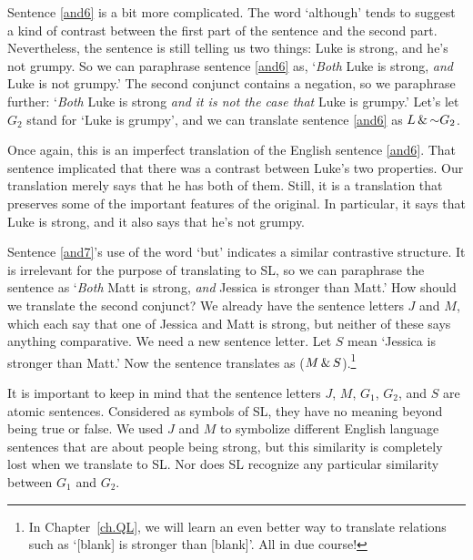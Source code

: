 Sentence \ref{and6} is a bit more complicated. The word `although' tends to suggest a kind of contrast between the first part of the sentence and the second part. Nevertheless, the sentence is still telling us two things: Luke is strong, and he's not grumpy. So we can paraphrase sentence \ref{and6} as, `\emph{Both} Luke is strong, \emph{and} Luke is not grumpy.' The second conjunct contains a negation, so we paraphrase further: `\emph{Both} Luke is strong \emph{and} \emph{it is not the case that} Luke is grumpy.' Let's let $G_{2}$ stand for `Luke is grumpy', and we can translate sentence \ref{and6} as $L\eand\enot G_{2}$.

Once again, this is an imperfect translation of the English sentence \ref{and6}. That sentence implicated that there was a contrast between Luke's two properties. Our translation merely says that he has both of them. Still, it is a translation that preserves some of the important features of the original. In particular, it says that Luke is strong, and it also says that he's not grumpy.

Sentence \ref{and7}'s use of the word `but' indicates a similar contrastive structure. It is irrelevant for the purpose of translating to SL, so we can paraphrase the sentence as `\emph{Both} Matt is strong, \emph{and} Jessica is stronger than Matt.' How should we translate the second conjunct? We already have the sentence letters $J$ and $M$, which each say that one of Jessica and Matt is strong, but neither of these says anything comparative. We need a new sentence letter. Let $S$ mean `Jessica is stronger than Matt.' Now the sentence translates as ($M \,\&\, S$).\footnote{{\color{black} In Chapter~\ref{ch.QL}, we will learn an even better way to translate relations such as `[blank] is stronger than [blank]'. All in due course!}}


It is important to keep in mind that the sentence letters $J$, $M$, $G_{1}$, $G_{2}$, and $S$ are atomic sentences. Considered as symbols of SL, they have no meaning beyond being true or false. We used $J$ and $M$ to symbolize different English language sentences that are about people being strong, but this similarity is completely lost when we translate to SL. Nor does SL recognize any particular similarity between $G_{1}$ and $G_{2}$. %

